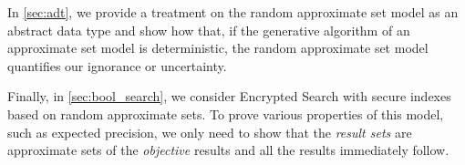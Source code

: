 \documentclass[ ../main.tex]{subfiles}
\begin{document}
In \cref{sec:adt}, we provide a treatment on the random approximate set model as an abstract data type and show how that, if the generative algorithm of an approximate set model is deterministic, the random approximate set model quantifies our ignorance or uncertainty.

Finally, in \cref{sec:bool_search}, we consider Encrypted Search with secure indexes based on random approximate sets.
To prove various properties of this model, such as expected precision, we only need to show that the \emph{result sets} are approximate sets of the \emph{objective} results and all the results immediately follow.
\end{document}
